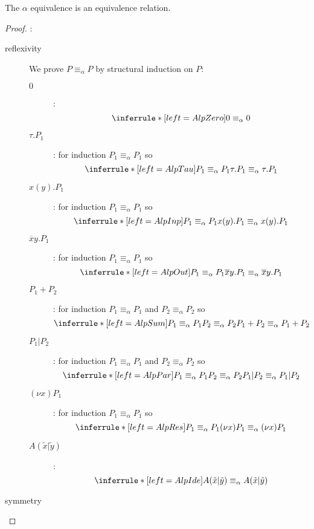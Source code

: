 \begin{lemma}
  The $\alpha$ equivalence is an equivalence relation.
  \begin{proof}:
    \begin{description}
      \item[reflexivity]
	We prove $P\equiv_{\alpha}P$ by structural induction on $P$:
	\begin{description}
	  \item[$0$]:
	    \[\inferrule* [left=AlpZero]{
	    }{
	      0\equiv_{\alpha}0
	    }\]
	  \item[$\tau.P_{1}$]:
	    for induction $P_{1}\equiv_{\alpha}P_{1}$ so
	    \[\inferrule* [left=AlpTau]{
	      P_{1}\equiv_{\alpha}P_{1}
	    }{
	      \tau.P_{1}\equiv_{\alpha}\tau.P_{1}
	    }\]
	  \item[$x(y).P_{1}$]:
	    for induction $P_{1}\equiv_{\alpha}P_{1}$ so
	    \[\inferrule* [left=AlpInp]{
	      P_{1}\equiv_{\alpha}P_{1}
	    }{
	      x(y).P_{1}\equiv_{\alpha}x(y).P_{1}
	    }\]
	  \item[$\overline{x}y.P_{1}$]:
	    for induction $P_{1}\equiv_{\alpha}P_{1}$ so
	    \[\inferrule* [left=AlpOut]{
	      P_{1}\equiv_{\alpha}P_{1}
	    }{
	      \overline{x}y.P_{1}\equiv_{\alpha}\overline{x}y.P_{1}
	    }\]
	  \item[$P_{1}+P_{2}$]:
	    for induction $P_{1}\equiv_{\alpha}P_{1}$ and $P_{2}\equiv_{\alpha}P_{2}$ so
	    \[\inferrule* [left=AlpSum]{
		  P_{1}\equiv_{\alpha}P_{1}
		\\
		  P_{2}\equiv_{\alpha}P_{2}
	    }{
	      P_{1}+P_{2}\equiv_{\alpha}P_{1}+P_{2}
	    }\]
	  \item[$P_{1}|P_{2}$]:
	    for induction $P_{1}\equiv_{\alpha}P_{1}$ and $P_{2}\equiv_{\alpha}P_{2}$ so
	    \[\inferrule* [left=AlpPar]{
		  P_{1}\equiv_{\alpha}P_{1}
		\\
		  P_{2}\equiv_{\alpha}P_{2}
	    }{
	      P_{1}|P_{2}\equiv_{\alpha}P_{1}|P_{2}
	    }\]
	  \item[$(\nu x)P_{1}$]:
	    for induction $P_{1}\equiv_{\alpha}P_{1}$ so
	    \[\inferrule* [left=AlpRes]{
	      P_{1}\equiv_{\alpha}P_{1}
	    }{
	      (\nu x)P_{1}\equiv_{\alpha}(\nu x)P_{1}
	    }\]
	  \item[$A(\tilde{x}|\tilde{y})$]:
	    \[\inferrule* [left=AlpIde]{
	    }{
	      A(\tilde{x}|\tilde{y})\equiv_{\alpha}A(\tilde{x}|\tilde{y})
	    }\]
	\end{description}
      \item[symmetry] %

\end{description}
\end{proof}
\end{lemma}
